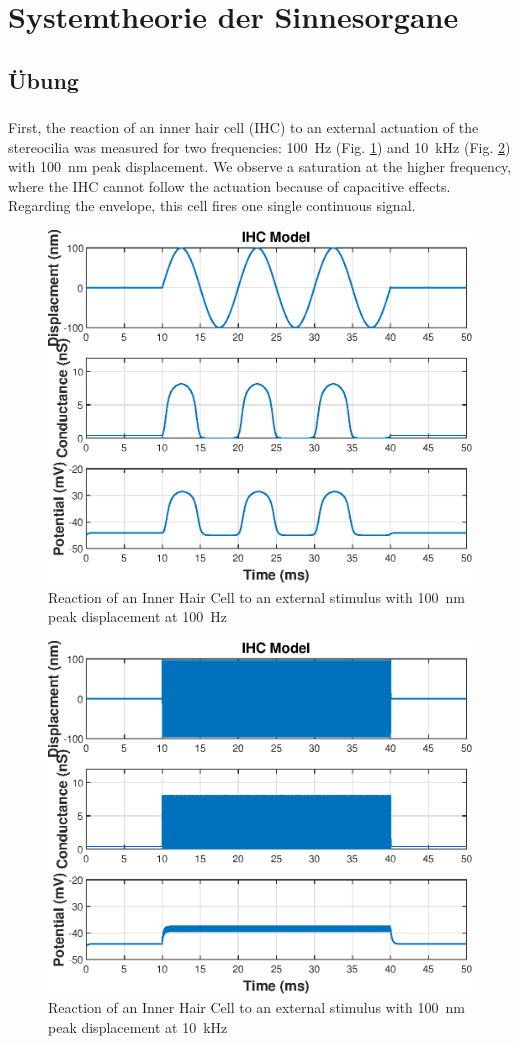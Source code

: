 \section*{Systemtheorie der Sinnesorgane}
\setcounter{subsection}{2} 
\subsection{Übung}
\subsubsection{}
First, the reaction of an inner hair cell (IHC) to an external actuation of the stereocilia was measured for two frequencies: \SI{100}{\hertz} (Fig. \ref{fig:signal100}) and \SI{10}{\kilo\hertz} (Fig. \ref{fig:signal10k}) with \SI{100}{\nano\meter} peak displacement. We observe a saturation at the higher frequency, where the IHC cannot follow the actuation because of capacitive effects. Regarding the envelope, this cell fires one single continuous signal. 
\begin{figure}[h] 
  \centering
  \includegraphics[width=.5\linewidth]{ue3/100Hz_100nm.eps} %
  \caption{Reaction of an Inner Hair Cell to an external stimulus with \SI{100}{\nano\meter} peak displacement at \SI{100}{\hertz}}
  \label{fig:signal100}
\end{figure}


\begin{figure}[h] 
  \centering
  \includegraphics[width=.5\linewidth]{ue3/10kHz_100nm.eps} %
  \caption{Reaction of an Inner Hair Cell to an external stimulus with \SI{100}{\nano\meter} peak displacement at \SI{10}{\kilo\hertz}}
  \label{fig:signal10k}
\end{figure}


